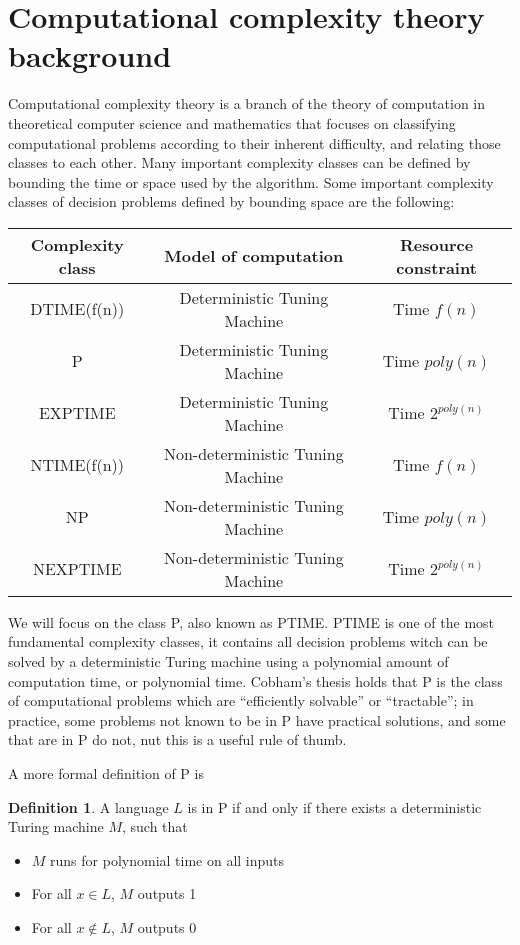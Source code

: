 \documentclass[12pt,a4paper]{book}
\theoremstyle{plain}
\theoremstyle{definition}
\newtheorem{definition}{Definition}
\theoremstyle{remark}
\begin{document}
\section{Computational complexity theory background}

Computational complexity theory is a branch of the theory of computation in theoretical computer science and mathematics that focuses on 
classifying computational problems according to their inherent difficulty, and relating those classes to each other. Many important complexity 
classes can be defined by bounding the time or space used by the algorithm. Some important complexity classes of decision problems defined by
bounding space are the following:

\begin{center}
\begin{tabular}[c]{c|c|c}
\textbf{Complexity class} & \textbf{Model of computation} & \textbf{Resource constraint}\\
\hline DTIME(f(n)) & Deterministic Tuning Machine & Time $f(n)$\\
P & Deterministic Tuning Machine & Time $poly(n)$\\
EXPTIME & Deterministic Tuning Machine & Time $2^{poly(n)}$\\
NTIME(f(n)) & Non-deterministic Tuning Machine & Time $f(n)$\\
NP & Non-deterministic Tuning Machine & Time $poly(n)$\\
NEXPTIME & Non-deterministic Tuning Machine & Time $2^{poly(n)}$
\end{tabular}
\end{center}

We will focus on the class P, also known as PTIME. PTIME is one of the most fundamental complexity classes, it contains all decision problems 
witch can be solved by a deterministic Turing machine using a polynomial amount of computation time, or polynomial time. Cobham's thesis holds 
that P is the class of computational problems which are ``efficiently solvable'' or ``tractable''; in practice, some problems not known to be in P have 
practical solutions, and some that are in P do not, nut this is a useful rule of thumb. 

A more formal definition of P is

\begin{definition}
 A language $L$ is in P if and only if there exists a deterministic Turing machine $M$, such that
\begin{itemize}
 \item $M$ runs for polynomial time on all inputs
 \item For all $x \in L$, $M$ outputs 1
 \item For all $x \notin L$, $M$ outputs 0
\end{itemize}
\end{definition}
\end{document}
